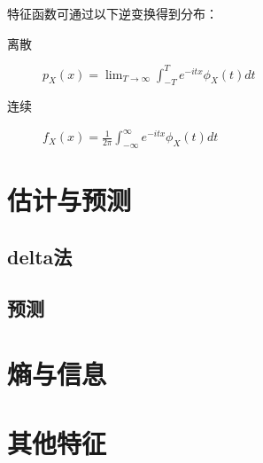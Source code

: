 \begin{theorem}
    特征函数可通过以下逆变换得到分布：
    \begin{description}
        \item[离散] $p_{X}(x)=\lim _{T \rightarrow \infty} \int_{-T}^{T} e^{-i t x} \phi_{X}(t) d t$
        \item[连续] $f_{X}(x)=\frac{1}{2 \pi} \int_{-\infty}^{\infty} e^{-i t x} \phi_{X}(t) d t$
    \end{description}
\end{theorem}

\section{估计与预测}

\subsection{delta法}

\subsection{预测}

\section{熵与信息}

\section{其他特征}

